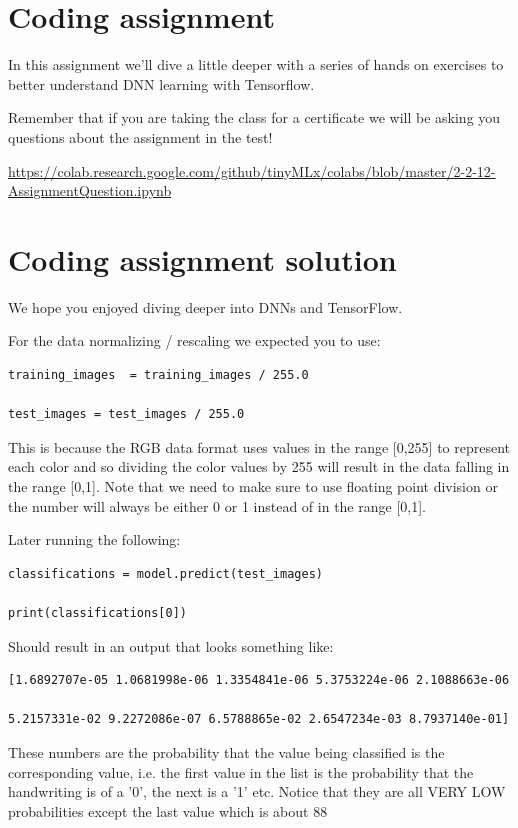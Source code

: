 \section{Coding assignment}

In this assignment we'll dive a little deeper with a series of hands on exercises to better understand DNN learning with Tensorflow.

Remember that if you are taking the class for a certificate we will be asking you questions about the assignment in the test!

\url{https://colab.research.google.com/github/tinyMLx/colabs/blob/master/2-2-12-AssignmentQuestion.ipynb}


\section{Coding assignment solution}

We hope you enjoyed diving deeper into DNNs and TensorFlow.

For the data normalizing / rescaling we expected you to use:

\begin{lstlisting}
training_images  = training_images / 255.0

test_images = test_images / 255.0
\end{lstlisting}

This is because the RGB data format uses values in the range [0,255] to represent each color and so dividing the color values by 255 will result in the data falling in the range [0,1]. Note that we need to make sure to use floating point division or the number will always be either 0 or 1 instead of in the range [0,1].

Later running the following:

\begin{lstlisting}
classifications = model.predict(test_images)

print(classifications[0])
\end{lstlisting}

Should result in an output that looks something like:

\begin{lstlisting}
[1.6892707e-05 1.0681998e-06 1.3354841e-06 5.3753224e-06 2.1088663e-06

5.2157331e-02 9.2272086e-07 6.5788865e-02 2.6547234e-03 8.7937140e-01]
\end{lstlisting}

These numbers are the probability that the value being classified is the corresponding value, i.e. the first value in the list is the probability that the handwriting is of a '0', the next is a '1' etc. Notice that they are all VERY LOW probabilities except the last value which is about 88%

